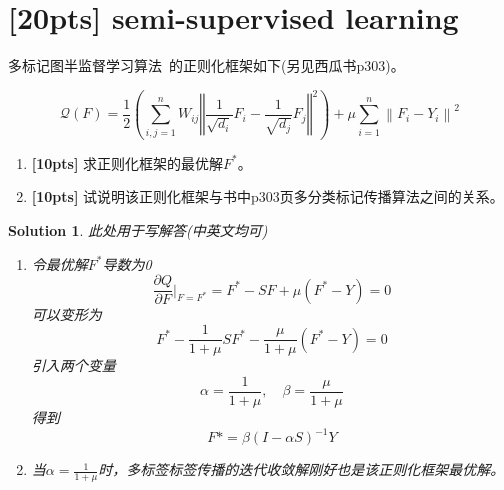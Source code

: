 \documentclass[a4paper,UTF8]{article}
\newtheorem*{solution}{Solution}
\numberwithin{equation}{section}
\begin{document}
\section{\textbf{[20pts]} semi-supervised learning}
	多标记图半监督学习算法~\citep{conf/nips/ZhouBLWS03}的正则化框架如下(另见西瓜书p303)。

\begin{equation}
\mathcal{Q}(F)=\frac{1}{2}\left(\sum_{i, j=1}^{n} W_{i j}\left\Vert\frac{1}{\sqrt{d_{i}}} F_{i}-\frac{1}{\sqrt{d_{j}}} F_{j}\right\Vert^{2}\right)+\mu \sum_{i=1}^{n}\left\|F_{i}-Y_{i}\right\|^{2}
\end{equation}
\begin{enumerate}
	\item  \textbf{[10pts]} 求正则化框架的最优解$F^*$。
	\item  \textbf{[10pts]} 试说明该正则化框架与书中p303页多分类标记传播算法之间的关系。
\end{enumerate}

\begin{solution}
此处用于写解答(中英文均可)
\begin{enumerate}
	\item 
	令最优解$F^*$导数为0
	\[\frac{\partial Q}{\partial F}\vert_{F=F^*}=F^*-SF+\mu(F^*-Y)=0\]
	可以变形为
	\[F^*-\frac{1}{1+\mu}SF^*-\frac{\mu}{1+\mu}(F^*-Y)=0\]
	引入两个变量
	\[\alpha=\frac{1}{1+\mu},\quad \beta=\frac{\mu}{1+\mu}\]
	得到
	\[F*=\beta(I-\alpha S)^{-1}Y\] 
	\item 
	当$\alpha=\frac{1}{1+\mu}$时，多标签标签传播的迭代收敛解刚好也是该正则化框架最优解。
\end{enumerate}
\end{solution}
\end{document}
